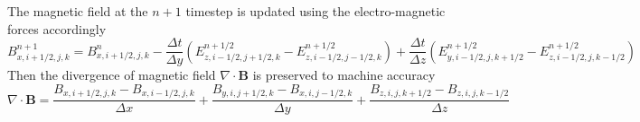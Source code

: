 \documentclass{article}
\begin{document}
The magnetic field at the $n+1$ timestep is updated using the electro-magnetic forces accordingly
\begin{equation}
B_{x, i+1 / 2, j, k}^{n+1}=B_{x, i+1 / 2, j, k}^n-\frac{\Delta t}{\Delta y}\left(E_{z, i-1 / 2, j+1 / 2, k}^{n+1 / 2}-E_{z, i-1 / 2, j-1 / 2, k}^{n+1 / 2}\right)+\frac{\Delta t}{\Delta z}\left(E_{y, i-1 / 2, j, k+1 / 2}^{n+1 / 2}-E_{z, i-1 / 2, j, k-1 / 2}^{n+1 / 2}\right)
\end{equation}
Then the divergence of magnetic field $\nabla\cdot \boldsymbol{B}$ is preserved to machine accuracy
\begin{equation}
\nabla \cdot \boldsymbol{B}  =\frac{B_{x, i+1 / 2, j, k}-B_{x, i-1 / 2, j, k}}{\Delta x} 
 +\frac{B_{y, i, j+1 / 2, k}-B_{x, i, j-1 / 2, k}}{\Delta y} 
 +\frac{B_{z, i, j, k+1 / 2}-B_{z, i, j, k-1 / 2}}{\Delta z}
\end{equation}
\end{document}
